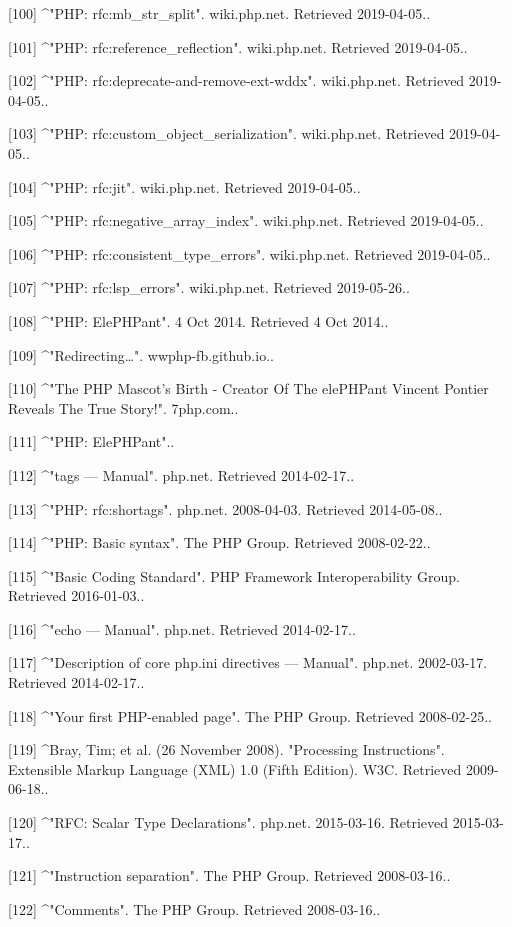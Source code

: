 [100]
^"PHP: rfc:mb_str_split". wiki.php.net. Retrieved 2019-04-05..

[101]
^"PHP: rfc:reference_reflection". wiki.php.net. Retrieved 2019-04-05..

[102]
^"PHP: rfc:deprecate-and-remove-ext-wddx". wiki.php.net. Retrieved 2019-04-05..

[103]
^"PHP: rfc:custom_object_serialization". wiki.php.net. Retrieved 2019-04-05..

[104]
^"PHP: rfc:jit". wiki.php.net. Retrieved 2019-04-05..

[105]
^"PHP: rfc:negative_array_index". wiki.php.net. Retrieved 2019-04-05..

[106]
^"PHP: rfc:consistent_type_errors". wiki.php.net. Retrieved 2019-04-05..

[107]
^"PHP: rfc:lsp_errors". wiki.php.net. Retrieved 2019-05-26..

[108]
^"PHP: ElePHPant". 4 Oct 2014. Retrieved 4 Oct 2014..

[109]
^"Redirecting…". wwphp-fb.github.io..

[110]
^"The PHP Mascot's Birth - Creator Of The elePHPant Vincent Pontier Reveals The True Story!". 7php.com..

[111]
^"PHP: ElePHPant"..

[112]
^"tags — Manual". php.net. Retrieved 2014-02-17..

[113]
^"PHP: rfc:shortags". php.net. 2008-04-03. Retrieved 2014-05-08..

[114]
^"PHP: Basic syntax". The PHP Group. Retrieved 2008-02-22..

[115]
^"Basic Coding Standard". PHP Framework Interoperability Group. Retrieved 2016-01-03..

[116]
^"echo — Manual". php.net. Retrieved 2014-02-17..

[117]
^"Description of core php.ini directives — Manual". php.net. 2002-03-17. 
Retrieved 2014-02-17..

[118]
^"Your first PHP-enabled page". The PHP Group. Retrieved 2008-02-25..

[119]
^Bray, Tim; et al. (26 November 2008). "Processing Instructions". Extensible Markup Language (XML) 1.0 (Fifth Edition). W3C. Retrieved 2009-06-18..

[120]
^"RFC: Scalar Type Declarations". php.net. 2015-03-16. Retrieved 2015-03-17..

[121]
^"Instruction separation". The PHP Group. Retrieved 2008-03-16..

[122]
^"Comments". The PHP Group. Retrieved 2008-03-16..

